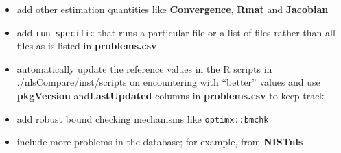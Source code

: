 \begin{itemize}
\tightlist
\item
  add other estimation quantities like \textbf{Convergence},
  \textbf{Rmat} and \textbf{Jacobian}
\item
  add \texttt{run\_specific} that runs a particular file or a list of
  files rather than all files as is listed in \textbf{problems.csv}
\item
  automatically update the reference values in the R scripts in
  ./nlsCompare/inst/scripts on encountering with ``better'' values and
  use \textbf{pkgVersion} and\textbf{LastUpdated} columns in
  \textbf{problems.csv} to keep track
\item
  add robust bound checking mechanisms like \texttt{optimx::bmchk}
\item
  include more problems in the database; for example, from
  \textbf{NISTnls}
\end{itemize}



\address{%
Arkajyoti Bhattacharjee\(^1\)\\
Mathematics and Statistics Department\\%
Indian Institute of Technology, Kanpur\\ India\\
%
%
%
\href{mailto:arkastat98@gmail.com}{\nolinkurl{arkastat98@gmail.com}}%
}

\address{%
John C. Nash\(^2\)\\
University of Ottawa\\%
\\
%
\url{https://journal.r-project.org}\\%
\textit{ORCiD: \href{https://orcid.org/0000-0002-9079-593X}{0000-0002-9079-593X}}\\%
\href{mailto:nashjc@uottawa.ca}{\nolinkurl{nashjc@uottawa.ca}}%
}

\address{%
Heather Turner\(^3\)\\
Department of Statistics\\%
University of Warwick\\ Coventry\\ United Kingdom\\
%
%
\textit{ORCiD: \href{https://orcid.org/0000-0002-1256-3375}{0000-0002-1256-3375}}\\%
\href{mailto:ht@heatherturner.net}{\nolinkurl{ht@heatherturner.net}}%
}
